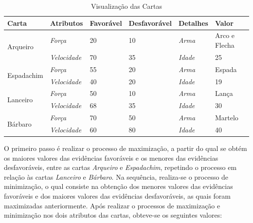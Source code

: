 \begin{table}[htb]
	\centering
	\caption{Visualização das Cartas}
	\label{tab:cartas}
	\begin{tabular}{|l|l|l|l|l|l|}
		\hline
		\textbf{Carta}              & \textbf{Atributos}  & \textbf{Favorável} & \textbf{Desfavorável} & \textbf{Detalhes} & \textbf{Valor} \\ \hline
		\multirow{2}{*}{Arqueiro}   & \textit{Força}      & 20                 & 10                    & \textit{Arma}     & Arco e Flecha  \\ \cline{2-6} 
		& \textit{Velocidade} & 70                 & 35                    & \textit{Idade}    & 25             \\ \hline
		\multirow{2}{*}{Espadachim} & \textit{Força}      & 55                 & 20                    & \textit{Arma}     & Espada         \\ \cline{2-6} 
		& \textit{Velocidade} & 40                 & 20                    & \textit{Idade}    & 19             \\ \hline
		\multirow{2}{*}{Lanceiro}   & \textit{Força}      & 50                 & 10                    & \textit{Arma}     & Lança          \\ \cline{2-6} 
		& \textit{Velocidade} & 68                 & 35                    & \textit{Idade}    & 30             \\ \hline
		\multirow{2}{*}{Bárbaro}    & \textit{Força}      & 70                 & 50                    & \textit{Arma}     & Martelo        \\ \cline{2-6} 
		& \textit{Velocidade} & 60                 & 80                    & \textit{Idade}    & 40             \\ \hline
	\end{tabular}
\end{table}

O primeiro passo é realizar o processo de maximização, a partir do qual se obtém os maiores valores das evidências favoráveis e os menores das evidências
desfavoráveis, entre as cartas \textit{Arqueiro} e \textit{Espadachim}, repetindo o processo em relação às cartas \textit{Lanceiro} e \textit{Bárbaro}. Na sequência, realiza-se o processo de minimização, o qual consiste na obtenção dos menores valores das evidências favoráveis e dos maiores valores das evidências desfavoráveis, as quais foram maximizadas anteriormente.
Após realizar o processos de maximização e minimização nos dois atributos das cartas, obteve-se os seguintes valores:

